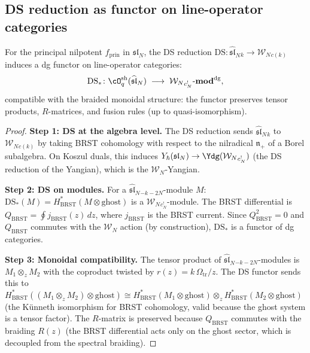 \subsection{DS reduction as functor on line-operator categories}

\begin{theorem}
For the principal nilpotent $f_{\mathrm{prin}}$ in
$\mathfrak{sl}_N$, the DS reduction
$\mathrm{DS}\colon
\widehat{\mathfrak{sl}}_N{}_k\to\mathcal{W}_N{}_{c(k)}$
induces a dg functor on line-operator categories:
\begin{equation}
\mathrm{DS}_*\colon
\cO_q^{\mathrm{sh}}(\widehat{\mathfrak{sl}}_N)
\;\longrightarrow\;
\mathcal{W}_N{}_{c^!_N}\text{-}\mathbf{mod}^{\mathrm{dg}},
\end{equation}
compatible with the braided monoidal structure: the functor
preserves tensor products, $R$-matrices, and fusion rules
(up to quasi-isomorphism).
\end{theorem}

\begin{proof}
\textbf{Step 1: DS at the algebra level.}
The DS reduction sends $\widehat{\mathfrak{sl}}_N{}_k$
to $\mathcal{W}_N{}_{c(k)}$ by taking BRST cohomology
with respect to the nilradical $\mathfrak{n}_+$ of a
Borel subalgebra. On Koszul duals, this induces
$Y_\hbar(\mathfrak{sl}_N)\to\Ydg(\mathcal{W}_N{}_{c^!_N})$
(the DS reduction of the Yangian), which is the
$\mathcal{W}_N$-Yangian.

\textbf{Step 2: DS on modules.}
For a $\widehat{\mathfrak{sl}}_N{}_{-k-2N}$-module $M$:
$\mathrm{DS}_*(M)
=H^*_{\mathrm{BRST}}(M\otimes\mathrm{ghost})$
is a $\mathcal{W}_N{}_{c^!_N}$-module. The BRST
differential is $Q_{\mathrm{BRST}}=\oint j_{\mathrm{BRST}}(z)\,dz$,
where $j_{\mathrm{BRST}}$ is the BRST current. Since
$Q_{\mathrm{BRST}}^2=0$ and $Q_{\mathrm{BRST}}$
commutes with the $\mathcal{W}_N$ action (by construction),
$\mathrm{DS}_*$ is a functor of dg categories.

\textbf{Step 3: Monoidal compatibility.}
The tensor product of
$\widehat{\mathfrak{sl}}_N{}_{-k-2N}$-modules is
$M_1\otimes_z M_2$ with the coproduct twisted by
$r(z)=k\,\Omega_{\mathrm{tr}}/z$. The DS functor sends this to
$H^*_{\mathrm{BRST}}((M_1\otimes_z M_2)\otimes\mathrm{ghost})
\cong
H^*_{\mathrm{BRST}}(M_1\otimes\mathrm{ghost})
\otimes_z
H^*_{\mathrm{BRST}}(M_2\otimes\mathrm{ghost})$
(the K\"unneth isomorphism for BRST cohomology, valid
because the ghost system is a tensor factor). The
$R$-matrix is preserved because
$Q_{\mathrm{BRST}}$ commutes with the braiding
$R(z)$ (the BRST differential acts only on the
ghost sector, which is decoupled from the spectral
braiding).
\end{proof}

